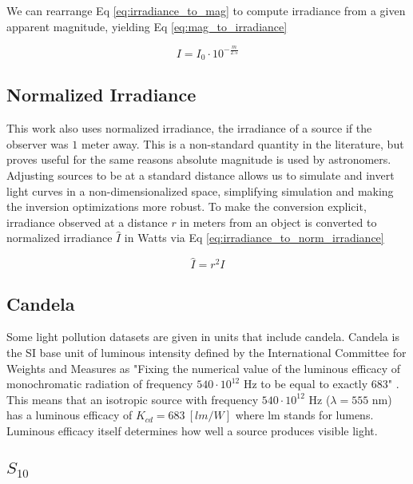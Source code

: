 We can rearrange Eq \ref{eq:irradiance_to_mag} to compute irradiance from a given apparent magnitude,
yielding Eq \ref{eq:mag_to_irradiance}

\begin{equation} \label{eq:mag_to_irradiance}
  I = I_0 \cdot 10^{-\frac{m}{2.5}}
\end{equation}

\subsection{Normalized Irradiance}

This work also uses normalized irradiance, the irradiance of a source if the observer was $1$ meter
away. This is a non-standard quantity in the literature, but proves useful for the same reasons
absolute magnitude is used by astronomers. Adjusting sources to be at a standard distance allows us
to simulate and invert light curves in a non-dimensionalized space, simplifying simulation and
making the inversion optimizations more robust. To make the conversion explicit, irradiance observed
at a distance $r$ in meters from an object is converted to normalized irradiance $\hat{I}$ in Watts via Eq
\ref{eq:irradiance_to_norm_irradiance}

\begin{equation} \label{eq:irradiance_to_norm_irradiance}
  \hat{I} = r^2 I
\end{equation}

\subsection{Candela}

Some light pollution datasets are given in units that include candela. Candela is the SI base unit of luminous intensity defined by the International Committee for Weights and Measures as "Fixing the numerical value of the luminous efficacy of monochromatic radiation of frequency $540\cdot10^{12}$ Hz to be equal to exactly $683$" \cite{nist_units}. This means that an isotropic source with frequency $540\cdot10^{12}$ Hz ($\lambda = 555$ nm) has a luminous efficacy of $K_{cd} = 683 \: \left[ lm/W \right]$ where lm stands for lumens. Luminous efficacy itself determines how well a source produces visible light. 

\subsection{$S_{10}$}

